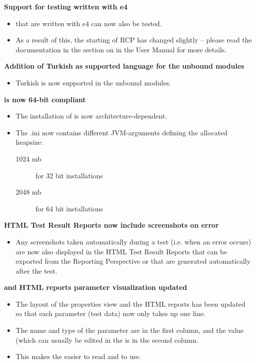 \textbf{Support for testing \gdauts{} written with e4}
\begin{itemize}
\item \gdauts{} that are written with e4 can now also be tested.  
\item As a result of this, the starting of RCP \gdauts{} has changed slightly -- please read the documentation in the section on  in the User Manual for more details. 
\end{itemize}

\textbf{Addition of Turkish as supported language for the unbound modules}
\begin{itemize}
\item Turkish is now supported in the unbound modules.
\end{itemize}

\textbf{\app{} is now 64-bit compliant}
\begin{itemize}
\item The installation of \app{} is now architecture-dependent.
\item The \app{}.ini now contains different JVM-arguments defining the allocated heapsize:
\begin{description}
\item [1024 mb]{for 32 bit installations}
\item [2048 mb]{for 64 bit installations}
\end{description}
\end{itemize}

\textbf{HTML Test Result Reports now include screenshots on error}
\begin{itemize}
\item Any screenshots taken automatically during a test (i.e. when an error occurs) are now also displayed in the HTML Test Result Reports that can be exported from the Reporting Perspective or that are generated automatically after the test. 
\end{itemize}

\textbf{\gdpropview{} and HTML reports parameter visualization updated}\\
\begin{itemize}
\item The layout of the properties view and the HTML reports has been updated so that each parameter (test data) now only takes up one line. 
\item The name and type of the parameter are in the first column, and the value (which can usually be edited in the \gdpropview{} is in the second column.
\item This makes the \gdpropview{} easier to read and to use. 
\end{itemize}

